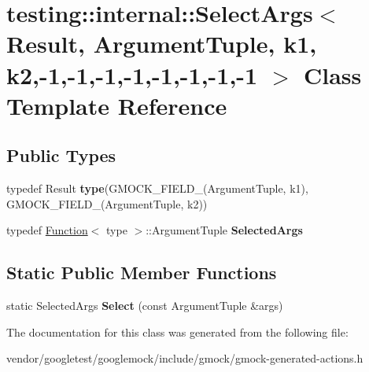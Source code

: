 \hypertarget{classtesting_1_1internal_1_1SelectArgs_3_01Result_00_01ArgumentTuple_00_01k1_00_01k2_00-1_00-1_08f7e2e7b6e994b5dc88747b054e9df66}{}\section{testing\+:\+:internal\+:\+:Select\+Args$<$ Result, Argument\+Tuple, k1, k2,-\/1,-\/1,-\/1,-\/1,-\/1,-\/1,-\/1,-\/1 $>$ Class Template Reference}
\label{classtesting_1_1internal_1_1SelectArgs_3_01Result_00_01ArgumentTuple_00_01k1_00_01k2_00-1_00-1_08f7e2e7b6e994b5dc88747b054e9df66}
\subsection*{Public Types}
\begin{DoxyCompactItemize}
\item 
typedef Result {\bfseries type}(G\+M\+O\+C\+K\+\_\+\+F\+I\+E\+L\+D\+\_\+(Argument\+Tuple, k1), G\+M\+O\+C\+K\+\_\+\+F\+I\+E\+L\+D\+\_\+(Argument\+Tuple, k2))\hypertarget{classtesting_1_1internal_1_1SelectArgs_3_01Result_00_01ArgumentTuple_00_01k1_00_01k2_00-1_00-1_08f7e2e7b6e994b5dc88747b054e9df66_a6a6ef276f21d62d535a5c64dba751801}{}\label{classtesting_1_1internal_1_1SelectArgs_3_01Result_00_01ArgumentTuple_00_01k1_00_01k2_00-1_00-1_08f7e2e7b6e994b5dc88747b054e9df66_a6a6ef276f21d62d535a5c64dba751801}

\item 
typedef \hyperlink{structtesting_1_1internal_1_1Function}{Function}$<$ type $>$\+::Argument\+Tuple {\bfseries Selected\+Args}\hypertarget{classtesting_1_1internal_1_1SelectArgs_3_01Result_00_01ArgumentTuple_00_01k1_00_01k2_00-1_00-1_08f7e2e7b6e994b5dc88747b054e9df66_ab3c711ab2b55d52ff660d1830f987268}{}\label{classtesting_1_1internal_1_1SelectArgs_3_01Result_00_01ArgumentTuple_00_01k1_00_01k2_00-1_00-1_08f7e2e7b6e994b5dc88747b054e9df66_ab3c711ab2b55d52ff660d1830f987268}

\end{DoxyCompactItemize}
\subsection*{Static Public Member Functions}
\begin{DoxyCompactItemize}
\item 
static Selected\+Args {\bfseries Select} (const Argument\+Tuple \&args)\hypertarget{classtesting_1_1internal_1_1SelectArgs_3_01Result_00_01ArgumentTuple_00_01k1_00_01k2_00-1_00-1_08f7e2e7b6e994b5dc88747b054e9df66_a151cf6edfedb245173fdb33699e822cf}{}\label{classtesting_1_1internal_1_1SelectArgs_3_01Result_00_01ArgumentTuple_00_01k1_00_01k2_00-1_00-1_08f7e2e7b6e994b5dc88747b054e9df66_a151cf6edfedb245173fdb33699e822cf}

\end{DoxyCompactItemize}


The documentation for this class was generated from the following file\+:\begin{DoxyCompactItemize}
\item 
vendor/googletest/googlemock/include/gmock/gmock-\/generated-\/actions.\+h\end{DoxyCompactItemize}
